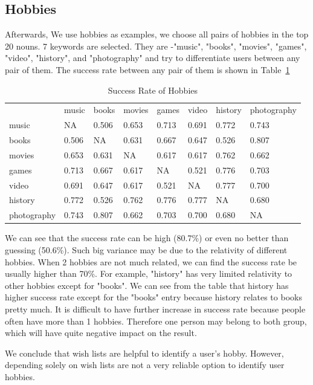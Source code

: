 \documentclass{llncs}
\begin{document}
\subsection{Hobbies}
Afterwards, We use hobbies as examples, we choose all pairs of hobbies in the top 20 nouns. 7 keywords are selected. They are -"music", "books", "movies", "games", "video", "history", and "photography" and try to differentiate users between any pair of them. The success rate between any pair of them is shown in Table~\ref{tb:hobby}

\begin{table}[!ht]
\centering
\caption{Success Rate of Hobbies}
\label{tb:hobby}
\begin{tabular}{llllllll}
            & music & books & movies & games & video & history & photography \\
music       & NA    & 0.506 & 0.653  & 0.713 & 0.691 & 0.772   & 0.743       \\
books       & 0.506 & NA    & 0.631  & 0.667 & 0.647 & 0.526   & 0.807       \\
movies      & 0.653 & 0.631 & NA     & 0.617 & 0.617 & 0.762   & 0.662       \\
games       & 0.713 & 0.667 & 0.617  & NA    & 0.521 & 0.776   & 0.703       \\
video       & 0.691 & 0.647 & 0.617  & 0.521 & NA    & 0.777   & 0.700       \\
history     & 0.772 & 0.526 & 0.762  & 0.776 & 0.777 & NA      & 0.680       \\
photography & 0.743 & 0.807 & 0.662  & 0.703 & 0.700 & 0.680   & NA         
\end{tabular}
\end{table}

We can see that the success rate can be high (80.7\%) or even no better than guessing (50.6\%). Such big variance may be due to the relativity of different hobbies. When 2 hobbies are not much related, we can find the success rate be usually higher than 70\%. For example, "history" has very limited relativity to other hobbies except for "books". We can see from the table that history has higher success rate except for the "books" entry because history relates to books pretty much. It is difficult to have further increase in success rate because people often have more than 1 hobbies. Therefore one person may belong to both group, which will have quite negative impact on the result.

We conclude that wish lists are helpful to identify a user's hobby. However, depending solely on wish lists are not a very reliable option to identify user hobbies. 
\end{document}
